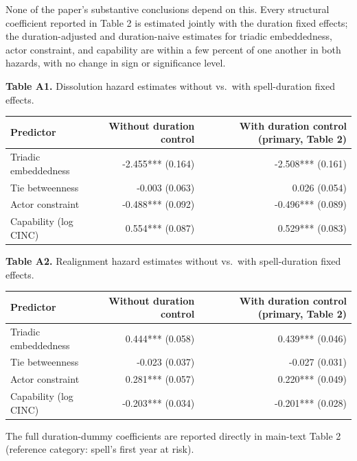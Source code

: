 \documentclass[Afour,sageh,times,doublespace]{sagej}
\begin{document}
None of the paper's substantive conclusions depend on this. Every structural coefficient reported in Table 2 is estimated jointly with the duration fixed effects; the duration-adjusted and duration-naive estimates for triadic embeddedness, actor constraint, and capability are within a few percent of one another in both hazards, with no change in sign or significance level.

\begin{table}[t]
\centering
\textbf{Table A1.} Dissolution hazard estimates without vs.\ with spell-duration fixed effects.

\vspace{4pt}
{\small\sf
\begin{tabular}{lrr}
\toprule
Predictor & Without duration control & With duration control (primary, Table 2)\\
\midrule
Triadic embeddedness & -2.455*** (0.164) & -2.508*** (0.161)\\
Tie betweenness & -0.003 (0.063) & 0.026 (0.054)\\
Actor constraint & -0.488*** (0.092) & -0.496*** (0.089)\\
Capability (log CINC) & 0.554*** (0.087) & 0.529*** (0.083)\\
\bottomrule
\end{tabular}
\par}
\end{table}

\begin{table}[t]
\centering
\textbf{Table A2.} Realignment hazard estimates without vs.\ with spell-duration fixed effects.

\vspace{4pt}
{\small\sf
\begin{tabular}{lrr}
\toprule
Predictor & Without duration control & With duration control (primary, Table 2)\\
\midrule
Triadic embeddedness & 0.444*** (0.058) & 0.439*** (0.046)\\
Tie betweenness & -0.023 (0.037) & -0.027 (0.031)\\
Actor constraint & 0.281*** (0.057) & 0.220*** (0.049)\\
Capability (log CINC) & -0.203*** (0.034) & -0.201*** (0.028)\\
\bottomrule
\end{tabular}
\par}
\end{table}

The full duration-dummy coefficients are reported directly in main-text Table 2 (reference category: spell's first year at risk).
\end{document}
